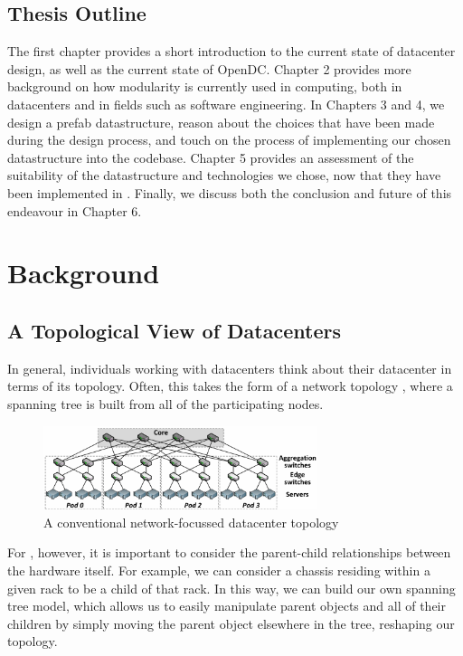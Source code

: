 \documentclass[11pt]{article}
\begin{document}
	\subsection{Thesis Outline}
		The first chapter provides a short introduction to the current state of datacenter design, as well as the current state of OpenDC. 
		Chapter 2 provides more background on how modularity is currently used in computing, both in datacenters and in fields such as software engineering. 
		In Chapters 3 and 4, we design a prefab datastructure, reason about the choices that have been made during the design process, and touch on the process of implementing our chosen datastructure into the \opendc{} codebase.
		Chapter 5 provides an assessment of the suitability of the datastructure and technologies we chose, now that they have been implemented in \opendc{}.
		Finally, we discuss both the conclusion and future of this endeavour in Chapter 6.
	

	

\newpage

\section{Background} \label{sec:background}

	\subsection{A Topological View of Datacenters}
		In general, individuals working with datacenters think about their datacenter in terms of its topology. 
		Often, this takes the form of a network topology \cite{Couto2012}, where a spanning tree is built from all of the participating nodes. 
		\begin{figure}[ht]
			\centering
			\includegraphics[width=8cm]{couto2012/Fat-tree-with-4-port-switches-n-4.png}
			\caption[A conventional network-focussed datacenter topology]{A conventional network-focussed datacenter topology \cite{Couto2012}}
		\end{figure}
		For \opendc{}, however, it is important to consider the parent-child relationships between the hardware itself. 
		For example, we can consider a chassis residing within a given rack to be a child of that rack.
		In this way, we can build our own spanning tree model, which allows us to easily manipulate parent objects and all of their children by simply moving the parent object elsewhere in the tree, reshaping our topology.
	
\end{document}
